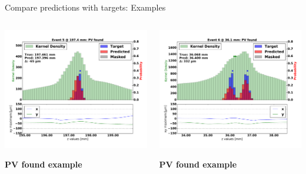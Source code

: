 \begin{frame}{Compare predictions with targets: Examples}
  \begin{columns}[c]
        \begin{center}
           \includegraphics[width=1\textwidth, trim=60 40 60 20]{images/07Jan19_AltCNN4Layer_D35_sp_30.pdf}

           \textbf{\color{lhcbBlue}\large PV found example}
       \end{center}
       \begin{center}
           \includegraphics[width=1\textwidth, trim=60 40 60 20]{images/07Jan19_AltCNN4Layer_D35_sp_32.pdf}

           \textbf{\color{lhcbBlue}\large PV found example}
       \end{center}
  \end{columns}
\end{frame}

